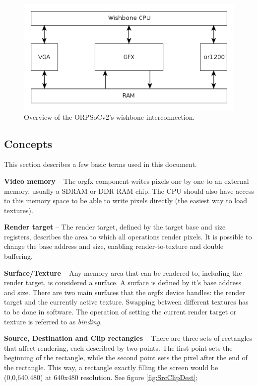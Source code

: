 \documentclass[10pt,a4paper]{article}
\begin{document}
\begin{figure}
\begin{center}
\includegraphics[scale=0.60]{../pictures/topology}
\caption{Overview of the ORPSoCv2's wishbone interconnection.}
\label{fig:topology}
\end{center}
\end{figure}

\subsection{Concepts}
This section describes a few basic terms used in this document.

\textbf{Video memory} -- The orgfx component writes pixels one by one to an external memory, usually a SDRAM or DDR RAM chip. The CPU should also have access to this memory space to be able to write pixels directly (the easiest way to load textures).

\textbf{Render target} -- The render target, defined by the target base and size registers, describes the area to which all operations render pixels. It is possible to change the base address and size, enabling render-to-texture and double buffering.

\textbf{Surface/Texture} -- Any memory area that can be rendered to, including the render target, is considered a surface. A surface is defined by it's base address and size. There are two main surfaces that the orgfx device handles: the render target and the currently active texture. Swapping between different textures has to be done in software. The operation of setting the current render target or texture is referred to as \textit{binding}.

\textbf{Source, Destination and Clip rectangles} -- There are three sets of rectangles that affect rendering, each described by two points. The first point sets the beginning of the rectangle, while the second point sets the pixel after the end of the rectangle. This way, a rectangle exactly filling the screen would be (0,0,640,480) at 640x480 resolution. See figure \ref{fig:SrcClipDest};
\end{document}
